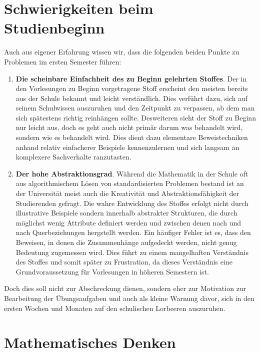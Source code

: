 \section{Schwierigkeiten beim Studienbeginn}
Auch aus eigener Erfahrung wissen wir, dass die folgenden beiden Punkte zu Problemen im ersten
Semester führen:
\begin{enumerate}
    \item
    \textbf{Die scheinbare Einfachheit des zu Beginn gelehrten Stoffes}. 
    Der in den Vorlesungen zu Beginn vorgetragene Stoff erscheint den meisten bereits aus der Schule bekannt 
    und leicht verständlich. Dies verführt dazu, sich auf seinem Schulwissen auszuruhen und den Zeitpunkt zu verpassen, 
    ab dem man sich spätestens richtig reinhängen sollte. Desweiteren sieht der Stoff zu Beginn nur leicht aus, doch es geht 
    auch nicht primär darum was behandelt wird, sondern wie es behandelt wird. Dies dient dazu elementare Beweistechniken
    anhand relativ einfacherer Beispiele kennenzulernen und sich langsam an komplexere Sachverhalte ranzutasten. 
    \item
    \textbf{Der hohe Abstraktionsgrad}. Während die Mathematik in der Schule oft aus algorithmischem Lösen von standardisierten 
    Problemen bestand ist an der Universität meist auch die Kreativität und Abstraktionsfähigkeit der Studierenden gefragt.
    Die wahre Entwicklung des Stoffes erfolgt nicht durch illustrative Beispiele sondern innerhalb abstrakter Strukturen, die durch 
    möglichst wenig Attribute definiert werden und zwischen denen nach und nach Querbeziehungen hergstellt werden. 
    Ein häufiger Fehler ist es, dass den Beweisen, in denen die Zusammenhänge aufgedeckt werden, nicht genug Bedeutung zugemessen wird.
    Dies führt zu einem mangelhaften Verständnis des Stoffes und somit später zu Frustration, da dieses Verständnis eine Grundvoraussetzung 
    für Vorlesungen in höheren Semestern ist. 
\end{enumerate}
Doch dies soll nicht zur Abschreckung dienen, sondern eher zur Motivation zur Bearbeitung der Übungsaufgaben und auch als kleine Warnung davor, 
sich in den ersten Wochen und Monaten auf den schulischen Lorbeeren auszuruhen. 

\section{Mathematisches Denken}

